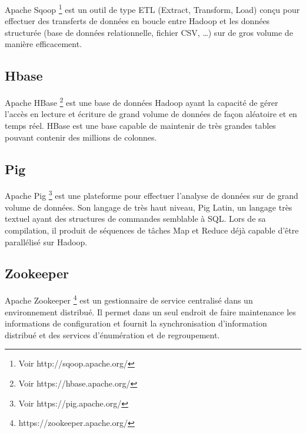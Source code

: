 \documentclass[12pt,english]{book}
\begin{document}
Apache Sqoop \footnote{Voir http://sqoop.apache.org/} est un outil de type ETL (Extract, Transform, Load) conçu pour effectuer des transferts de données en boucle entre Hadoop et les données structurée (base de données relationnelle, fichier CSV, …) sur de gros volume de manière efficacement.  

\subsection{Hbase}

Apache HBase \footnote{Voir https://hbase.apache.org/} est une base de données Hadoop ayant la capacité de gérer l’accès en lecture et écriture de grand volume de données de façon aléatoire et en temps réel. HBase est une base capable de maintenir de très grandes tables pouvant contenir des millions de colonnes.    

\subsection{Pig}

Apache Pig \footnote{Voir https://pig.apache.org/} est une plateforme pour effectuer l’analyse de données sur de grand volume de données. Son langage de très haut niveau, Pig Latin, un langage très textuel ayant des structures de commandes semblable à SQL. Lors de sa compilation, il produit de séquences de tâches Map et Reduce déjà capable d’être parallélisé sur Hadoop.  

\subsection{Zookeeper}

Apache Zookeeper \footnote{https://zookeeper.apache.org/} est un gestionnaire de service centralisé dans un environnement distribué. Il permet dans un seul endroit de faire maintenance les informations de configuration et fournit la synchronisation d’information distribué et des services d’énumération et de regroupement.   
\end{document}
